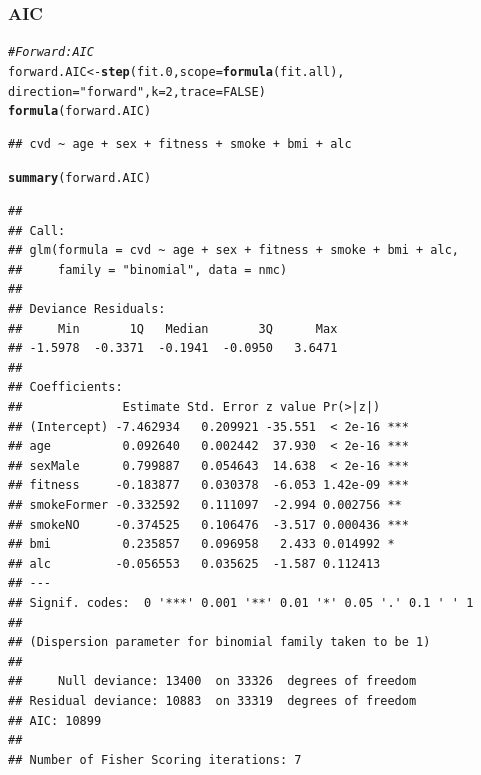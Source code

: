 \documentclass{article}\usepackage[]{graphicx}\usepackage[]{xcolor}
\makeatletter
\newcommand{\hlnum}[1]{\textcolor[rgb]{0.686,0.059,0.569}{#1}}%
\newcommand{\hlstr}[1]{\textcolor[rgb]{0.192,0.494,0.8}{#1}}%
\newcommand{\hlcom}[1]{\textcolor[rgb]{0.678,0.584,0.686}{\textit{#1}}}%
\newcommand{\hlstd}[1]{\textcolor[rgb]{0.345,0.345,0.345}{#1}}%
\newcommand{\hlkwb}[1]{\textcolor[rgb]{0.69,0.353,0.396}{#1}}%
\newcommand{\hlkwc}[1]{\textcolor[rgb]{0.333,0.667,0.333}{#1}}%
\newcommand{\hlkwd}[1]{\textcolor[rgb]{0.737,0.353,0.396}{\textbf{#1}}}%
\newenvironment{kframe}{%
 \def\at@end@of@kframe{}%
 \ifinner\ifhmode%
  \def\at@end@of@kframe{\end{minipage}}%
  \begin{minipage}{\columnwidth}%
 \fi\fi%
 \def\FrameCommand##1{\hskip\@totalleftmargin \hskip-\fboxsep
 \colorbox{shadecolor}{##1}\hskip-\fboxsep
     \hskip-\linewidth \hskip-\@totalleftmargin \hskip\columnwidth}%
 \MakeFramed {\advance\hsize-\width
   \@totalleftmargin\z@ \linewidth\hsize
   \@setminipage}}%
 {\par\unskip\endMakeFramed%
 \at@end@of@kframe}
\newenvironment{knitrout}{}{} %
\makeatother
\begin{document}
      \subsubsection{AIC}
\begin{knitrout}
\color{fgcolor}\begin{kframe}
\begin{alltt}
\hlcom{#Forward: AIC}
\hlstd{forward.AIC} \hlkwb{<-} \hlkwd{step}\hlstd{(fit.0,} \hlkwc{scope}\hlstd{=}\hlkwd{formula}\hlstd{(fit.all),}
                   \hlkwc{direction}\hlstd{=}\hlstr{"forward"}\hlstd{,} \hlkwc{k}\hlstd{=}\hlnum{2}\hlstd{,} \hlkwc{trace}\hlstd{=}\hlnum{FALSE}\hlstd{)}
\hlkwd{formula}\hlstd{(forward.AIC)}
\end{alltt}
\begin{verbatim}
## cvd ~ age + sex + fitness + smoke + bmi + alc
\end{verbatim}
\begin{alltt}
\hlkwd{summary}\hlstd{(forward.AIC)}
\end{alltt}
\begin{verbatim}
## 
## Call:
## glm(formula = cvd ~ age + sex + fitness + smoke + bmi + alc, 
##     family = "binomial", data = nmc)
## 
## Deviance Residuals: 
##     Min       1Q   Median       3Q      Max  
## -1.5978  -0.3371  -0.1941  -0.0950   3.6471  
## 
## Coefficients:
##              Estimate Std. Error z value Pr(>|z|)    
## (Intercept) -7.462934   0.209921 -35.551  < 2e-16 ***
## age          0.092640   0.002442  37.930  < 2e-16 ***
## sexMale      0.799887   0.054643  14.638  < 2e-16 ***
## fitness     -0.183877   0.030378  -6.053 1.42e-09 ***
## smokeFormer -0.332592   0.111097  -2.994 0.002756 ** 
## smokeNO     -0.374525   0.106476  -3.517 0.000436 ***
## bmi          0.235857   0.096958   2.433 0.014992 *  
## alc         -0.056553   0.035625  -1.587 0.112413    
## ---
## Signif. codes:  0 '***' 0.001 '**' 0.01 '*' 0.05 '.' 0.1 ' ' 1
## 
## (Dispersion parameter for binomial family taken to be 1)
## 
##     Null deviance: 13400  on 33326  degrees of freedom
## Residual deviance: 10883  on 33319  degrees of freedom
## AIC: 10899
## 
## Number of Fisher Scoring iterations: 7
\end{verbatim}
\end{kframe}
\end{knitrout}
        
      \clearpage 
      
\end{document}
